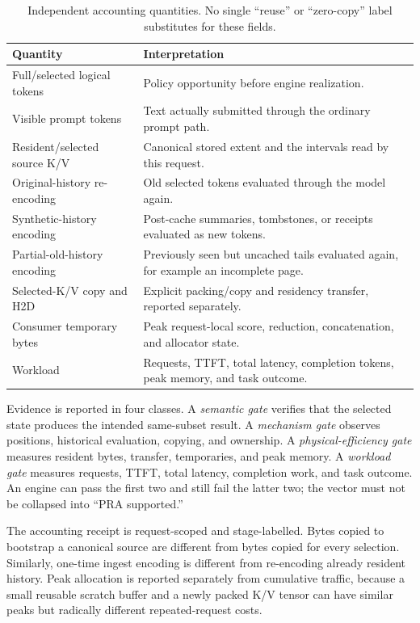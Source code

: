 \documentclass[11pt]{article}
\begin{document}
\begin{table}[H]
\centering
\small
\begin{tabularx}{\linewidth}{p{.28\linewidth}Y}
\toprule
Quantity & Interpretation \\
\midrule
Full/selected logical tokens & Policy opportunity before engine realization. \\
Visible prompt tokens & Text actually submitted through the ordinary prompt path. \\
Resident/selected source K/V & Canonical stored extent and the intervals read by this request. \\
Original-history re-encoding & Old selected tokens evaluated through the model again. \\
Synthetic-history encoding & Post-cache summaries, tombstones, or receipts evaluated as new tokens. \\
Partial-old-history encoding & Previously seen but uncached tails evaluated again, for example an incomplete page. \\
Selected-K/V copy and H2D & Explicit packing/copy and residency transfer, reported separately. \\
Consumer temporary bytes & Peak request-local score, reduction, concatenation, and allocator state. \\
Workload & Requests, TTFT, total latency, completion tokens, peak memory, and task outcome. \\
\bottomrule
\end{tabularx}
\caption{Independent accounting quantities.  No single ``reuse'' or
``zero-copy'' label substitutes for these fields.}
\label{tab:editorial-accounting}
\end{table}

Evidence is reported in four classes.  A \emph{semantic gate} verifies that the
selected state produces the intended same-subset result.  A \emph{mechanism
gate} observes positions, historical evaluation, copying, and ownership.  A
\emph{physical-efficiency gate} measures resident bytes, transfer, temporaries,
and peak memory.  A \emph{workload gate} measures requests, TTFT, total latency,
completion work, and task outcome.  An engine can pass the first two and still
fail the latter two; the vector must not be collapsed into ``PRA supported.''

The accounting receipt is request-scoped and stage-labelled.  Bytes copied to
bootstrap a canonical source are different from bytes copied for every
selection.  Similarly, one-time ingest encoding is different from re-encoding
already resident history.  Peak allocation is reported separately from
cumulative traffic, because a small reusable scratch buffer and a newly packed
K/V tensor can have similar peaks but radically different repeated-request
costs.
\end{document}
